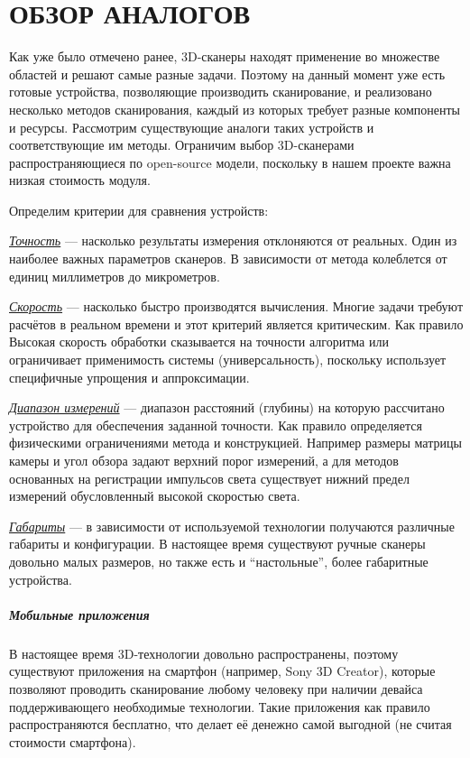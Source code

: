 \chapter{ОБЗОР АНАЛОГОВ}
    Как уже было отмечено ранее, 3D-сканеры находят применение во множестве областей и решают самые разные задачи. Поэтому на данный момент уже есть готовые устройства, позволяющие производить сканирование, и реализовано несколько методов сканирования, каждый из которых требует разные компоненты и ресурсы. Рассмотрим существующие аналоги таких устройств и соответствующие им методы. Ограничим выбор 3D-сканерами распространяющиеся по open-source модели, поскольку в нашем проекте важна низкая стоимость модуля.
    
    Определим критерии для сравнения устройств:

    
    \underline{\textit{Точность}} --- насколько результаты измерения отклоняются от реальных. Один из наиболее важных параметров сканеров. В зависимости от метода колеблется от единиц миллиметров до микрометров.
    
    \underline{\textit{Скорость}} --- насколько быстро производятся вычисления. Многие задачи требуют расчётов в реальном времени и этот критерий является критическим. Как правило Высокая скорость обработки сказывается на точности алгоритма или ограничивает применимость системы (универсальность), поскольку использует специфичные упрощения и аппроксимации.
    
    \underline{\textit{Диапазон измерений}} --- диапазон расстояний (глубины) на которую рассчитано устройство для обеспечения заданной точности. Как правило определяется физическими ограничениями метода и конструкцией. Например размеры матрицы камеры и угол обзора задают верхний порог измерений, а для методов основанных на регистрации импульсов света существует нижний предел измерений обусловленный высокой скоростью света.
    
    \underline{\textit{Габариты}} --- в зависимости от используемой технологии получаются различные габариты и конфигурации. В настоящее время существуют ручные сканеры довольно малых размеров, но также есть и “настольные”, более габаритные устройства.

    \paragraph{Мобильные приложения}
        В настоящее время 3D-технологии довольно распространены, поэтому существуют приложения на смартфон (например, Sony 3D Creator), которые позволяют проводить сканирование любому человеку при наличии девайса поддерживающего необходимые технологии. Такие приложения как правило распространяются бесплатно, что делает её денежно самой выгодной (не считая стоимости смартфона).

